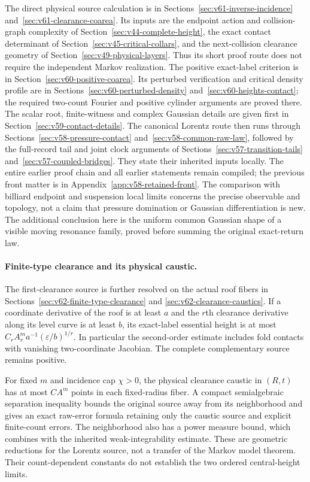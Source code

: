 The direct physical source calculation is in
Sections~\ref{sec:v61-inverse-incidence} and~\ref{sec:v61-clearance-coarea}.
Its inputs are the endpoint action and collision-graph complexity of
Section~\ref{sec:v44-complete-height}, the exact contact determinant of
Section~\ref{sec:v45-critical-collars}, and the next-collision clearance
geometry of Section~\ref{sec:v49-physical-layers}. Thus its short proof
route does not require the independent Markov realization.
The positive exact-label criterion is in
Section~\ref{sec:v60-positive-coarea}. Its perturbed verification and
critical density profile are in Sections~\ref{sec:v60-perturbed-density}
and~\ref{sec:v60-heights-contact}; the required two-count Fourier and
positive cylinder arguments are proved there. The scalar root,
finite-witness and complex Gaussian details are given
first in Section~\ref{sec:v59-contact-details}. The canonical Lorentz
route then runs through Sections~\ref{sec:v58-pressure-contact}
and~\ref{sec:v58-common-raw-law}, followed by the full-record tail
and joint clock arguments of
Sections~\ref{sec:v57-transition-tails} and~\ref{sec:v57-coupled-bridges}.
They state their inherited inputs locally. The entire earlier proof
chain and all earlier statements remain compiled; the previous front
matter is in Appendix~\ref{app:v58-retained-front}.
The comparison with billiard endpoint and suspension local limits
\cite{DPZ,DN} concerns the precise observable and topology, not a
claim that pressure domination or Gaussian differentiation is new.
The additional conclusion here is the uniform common Gaussian shape
of a visible moving resonance family, proved before summing the
original exact-return law.

\paragraph{Finite-type clearance and its physical caustic.}
The first-clearance source is further resolved on the actual roof
fibers in Sections~\ref{sec:v62-finite-type-clearance} and
\ref{sec:v62-clearance-caustics}. If a coordinate derivative of the
roof is at least $a$ and the $r$th clearance derivative along its level
curve is at least $b$, its exact-label essential height is at most
$C_rA_r^m a^{-1}(\varepsilon/b)^{1/r}$. In particular the second-order
estimate includes fold contacts with vanishing two-coordinate
Jacobian. The complete complementary source remains positive.

For fixed $m$ and incidence cap $\chi>0$, the physical clearance
caustic in $(R,t)$ has at most $CA^m$ points in each fixed-radius
fiber. A compact semialgebraic separation inequality bounds the
original source away from its neighborhood and gives an exact
raw-error formula retaining only the caustic source and explicit
finite-count errors. The neighborhood also has a power measure bound,
which combines with the inherited weak-integrability estimate.
These are geometric reductions for the Lorentz source, not a transfer
of the Markov model theorem. Their count-dependent constants do not
establish the two ordered central-height limits.


